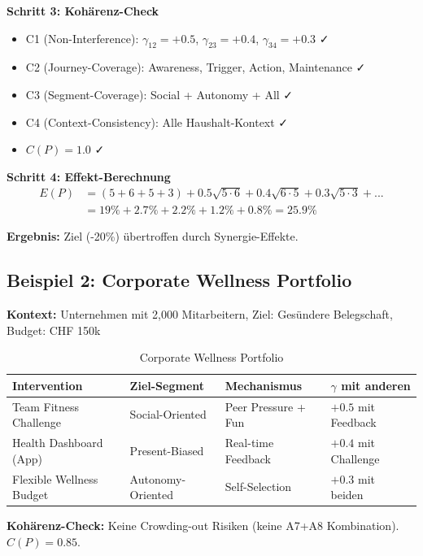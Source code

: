 \textbf{Schritt 3: Kohärenz-Check}
\begin{itemize}[nosep]
\item C1 (Non-Interference): $\gamma_{12} = +0.5$, $\gamma_{23} = +0.4$, $\gamma_{34} = +0.3$ ✓
\item C2 (Journey-Coverage): Awareness, Trigger, Action, Maintenance ✓
\item C3 (Segment-Coverage): Social + Autonomy + All ✓
\item C4 (Context-Consistency): Alle Haushalt-Kontext ✓
\item \textbf{$C(P) = 1.0$} ✓
\end{itemize}

\textbf{Schritt 4: Effekt-Berechnung}
\begin{align}
E(P) &= (5 + 6 + 5 + 3) + 0.5\sqrt{5 \cdot 6} + 0.4\sqrt{6 \cdot 5} + 0.3\sqrt{5 \cdot 3} + ... \nonumber\\
&= 19\% + 2.7\% + 2.2\% + 1.2\% + 0.8\% = \mathbf{25.9\%}
\label{eq:20-anna-calculation}
\end{align}

\textbf{Ergebnis:} Ziel (-20\%) übertroffen durch Synergie-Effekte.

\subsection{Beispiel 2: Corporate Wellness Portfolio}

\textbf{Kontext:} Unternehmen mit 2,000 Mitarbeitern, Ziel: Gesündere Belegschaft, Budget: CHF 150k

\begin{table}[htbp]
\centering
\caption{Corporate Wellness Portfolio}
\label{tab:20-example-wellness}
\renewcommand{\arraystretch}{1.3}
\small
\begin{tabular}{@{}llll@{}}
\toprule
\textbf{Intervention} & \textbf{Ziel-Segment} & \textbf{Mechanismus} & \textbf{$\gamma$ mit anderen} \\
\midrule
Team Fitness Challenge & Social-Oriented & Peer Pressure + Fun & $+0.5$ mit Feedback \\
Health Dashboard (App) & Present-Biased & Real-time Feedback & $+0.4$ mit Challenge \\
Flexible Wellness Budget & Autonomy-Oriented & Self-Selection & $+0.3$ mit beiden \\
\bottomrule
\end{tabular}
\end{table}

\textbf{Kohärenz-Check:} Keine Crowding-out Risiken (keine A7+A8 Kombination). $C(P) = 0.85$.

